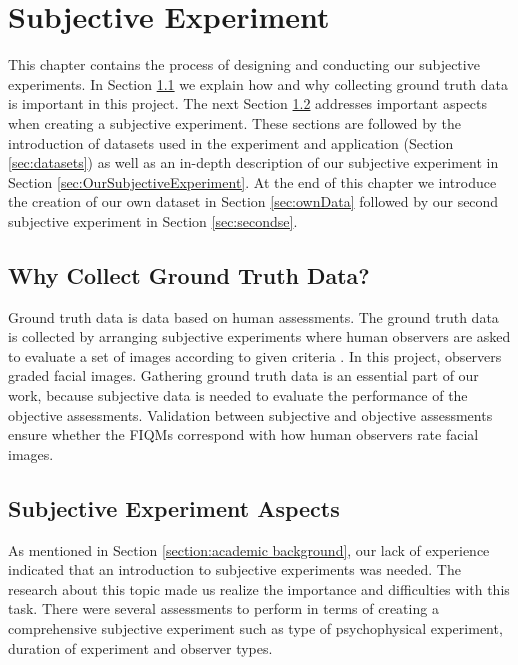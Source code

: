 \chapter{Subjective Experiment}


\label{chap:subjective}
This chapter contains the process of designing and conducting our subjective experiments. In Section \ref{sec:groundTruth} we explain how and why collecting ground truth data is important in this project. The next Section \ref{sec:SubjectiveAspects} addresses important aspects when creating a subjective experiment. These sections are followed by the introduction of datasets used in the experiment and application (Section \ref{sec:datasets}) as well as an in-depth description of our subjective experiment in Section \ref{sec:OurSubjectiveExperiment}. At the end of this chapter we introduce the creation of our own dataset in Section \ref{sec:ownData} followed by our second subjective experiment in Section \ref{sec:secondse}.

\section{Why Collect Ground Truth Data?}
\label{sec:groundTruth}
Ground truth data is data based on human assessments. The ground truth data is collected by arranging subjective experiments where human observers are asked to evaluate a set of images according to given criteria \cite{Xphdthesis}. In this project, observers graded facial images. Gathering ground truth data is an essential part of our work, because subjective data is needed to evaluate the performance of the objective assessments. Validation between subjective and objective assessments ensure whether the FIQMs correspond with how human observers rate facial images. 

\section{Subjective Experiment Aspects}
\label{sec:SubjectiveAspects}
As mentioned in Section \ref{section:academic background}, our lack of experience indicated that an introduction to subjective experiments was needed. The research about this topic made us realize the importance and difficulties with this task. There were several assessments to perform in terms of creating a comprehensive subjective experiment such as type of psychophysical experiment, duration of experiment and observer types.


